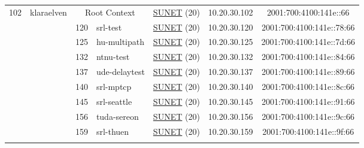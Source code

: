 \begin{small}
\begin{center}
\begin{longtable}{|c|c|c|c|c|c|c|c|}
 \multirow{16}{*}{\tiny{102}} & \multicolumn{1}{|l|}{\multirow{16}{*}{\tiny{klaraelven}}} & \multicolumn{2}{|c|}{\tiny{Root Context}} & \multicolumn{2}{|c|}{\tiny{\href{http://www.sunet.se}{SUNET} (20)}} & \tiny{10.20.30.102} & \tiny{2001:700:4100:141e::66} \\* \cline{3-3}\cline{4-4}\cline{5-5}\cline{6-6}\cline{7-7}\cline{8-8}
  &  & \tiny{120} & \multicolumn{1}{|l|}{\tiny{srl-test}} & \multicolumn{2}{|c|}{\tiny{\href{http://www.sunet.se}{SUNET} (20)}} & \tiny{10.20.30.120} & \tiny{2001:700:4100:141e::78:66} \\* \cline{3-3}\cline{4-4}\cline{5-5}\cline{6-6}\cline{7-7}\cline{8-8}
  &  & \tiny{125} & \multicolumn{1}{|l|}{\tiny{hu-multipath}} & \multicolumn{2}{|c|}{\tiny{\href{http://www.sunet.se}{SUNET} (20)}} & \tiny{10.20.30.125} & \tiny{2001:700:4100:141e::7d:66} \\* \cline{3-3}\cline{4-4}\cline{5-5}\cline{6-6}\cline{7-7}\cline{8-8}
  &  & \tiny{132} & \multicolumn{1}{|l|}{\tiny{ntnu-test}} & \multicolumn{2}{|c|}{\tiny{\href{http://www.sunet.se}{SUNET} (20)}} & \tiny{10.20.30.132} & \tiny{2001:700:4100:141e::84:66} \\* \cline{3-3}\cline{4-4}\cline{5-5}\cline{6-6}\cline{7-7}\cline{8-8}
  &  & \tiny{137} & \multicolumn{1}{|l|}{\tiny{ude-delaytest}} & \multicolumn{2}{|c|}{\tiny{\href{http://www.sunet.se}{SUNET} (20)}} & \tiny{10.20.30.137} & \tiny{2001:700:4100:141e::89:66} \\* \cline{3-3}\cline{4-4}\cline{5-5}\cline{6-6}\cline{7-7}\cline{8-8}
  &  & \tiny{140} & \multicolumn{1}{|l|}{\tiny{srl-mptcp}} & \multicolumn{2}{|c|}{\tiny{\href{http://www.sunet.se}{SUNET} (20)}} & \tiny{10.20.30.140} & \tiny{2001:700:4100:141e::8c:66} \\* \cline{3-3}\cline{4-4}\cline{5-5}\cline{6-6}\cline{7-7}\cline{8-8}
  &  & \tiny{145} & \multicolumn{1}{|l|}{\tiny{srl-seattle}} & \multicolumn{2}{|c|}{\tiny{\href{http://www.sunet.se}{SUNET} (20)}} & \tiny{10.20.30.145} & \tiny{2001:700:4100:141e::91:66} \\* \cline{3-3}\cline{4-4}\cline{5-5}\cline{6-6}\cline{7-7}\cline{8-8}
  &  & \tiny{156} & \multicolumn{1}{|l|}{\tiny{tuda-sereon}} & \multicolumn{2}{|c|}{\tiny{\href{http://www.sunet.se}{SUNET} (20)}} & \tiny{10.20.30.156} & \tiny{2001:700:4100:141e::9c:66} \\* \cline{3-3}\cline{4-4}\cline{5-5}\cline{6-6}\cline{7-7}\cline{8-8}
  &  & \tiny{159} & \multicolumn{1}{|l|}{\tiny{srl-thuen}} & \multicolumn{2}{|c|}{\tiny{\href{http://www.sunet.se}{SUNET} (20)}} & \tiny{10.20.30.159} & \tiny{2001:700:4100:141e::9f:66} \\* \cline{3-3}\cline{4-4}\cline{5-5}\cline{6-6}\cline{7-7}\cline{8-8}

\end{longtable}
\end{center}
\end{small}
